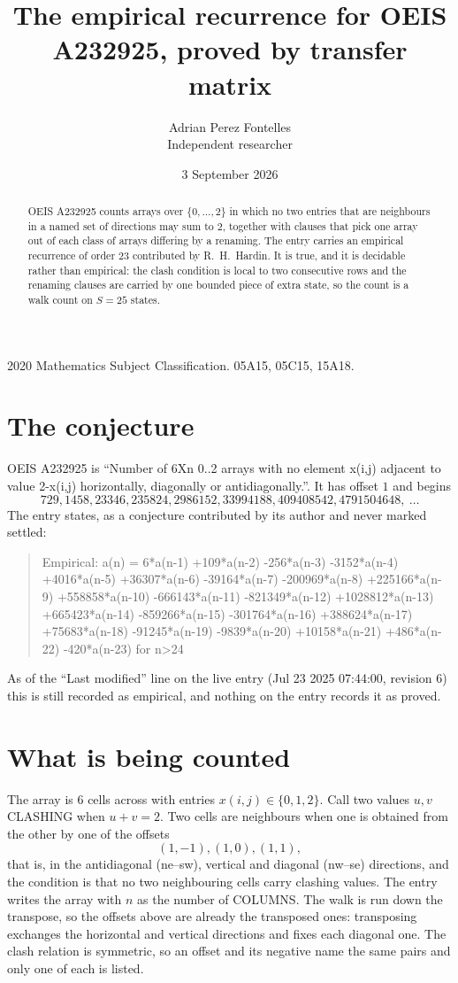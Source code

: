 \documentclass[11pt,a4paper]{article}
\title{The empirical recurrence for OEIS A232925, proved by transfer matrix}
\author{Adrian Perez Fontelles\\ \small Independent researcher}
\date{3 September 2026}
\theoremstyle{plain}
\theoremstyle{definition}
\begin{document}
\maketitle

\begin{abstract}
OEIS A232925 counts arrays over $\{0,\dots,2\}$ in which no two entries that are neighbours in
a named set of directions may sum to $2$, together with clauses that pick one array out of
each class of arrays differing by a renaming. The entry carries an empirical recurrence of
order $23$ contributed by R.~H.~Hardin. It is true, and it is decidable rather than
empirical: the clash condition is local to two consecutive rows and the renaming clauses are
carried by one bounded piece of extra state, so the count is a walk count on $S=25$ states.
\end{abstract}

\noindent\small 2020 Mathematics Subject Classification. 05A15, 05C15, 15A18.\normalsize

\section{The conjecture}

OEIS A232925 is ``Number of 6Xn 0..2 arrays with no element x(i,j) adjacent to value 2-x(i,j) horizontally, diagonally or antidiagonally.''. It has offset $1$ and begins
\[
729, 1458, 23346, 235824, 2986152, 33994188, 409408542, 4791504648,\ \dots
\]
The entry states, as a conjecture contributed by its author and never marked settled:
\begin{quote}
Empirical: a(n) = 6*a(n-1) +109*a(n-2) -256*a(n-3) -3152*a(n-4) +4016*a(n-5) +36307*a(n-6) -39164*a(n-7) -200969*a(n-8) +225166*a(n-9) +558858*a(n-10) -666143*a(n-11) -821349*a(n-12) +1028812*a(n-13) +665423*a(n-14) -859266*a(n-15) -301764*a(n-16) +388624*a(n-17) +75683*a(n-18) -91245*a(n-19) -9839*a(n-20) +10158*a(n-21) +486*a(n-22) -420*a(n-23) for n>24
\end{quote}
As of the ``Last modified'' line on the live entry (Jul 23 2025 07:44:00, revision 6) this is still
recorded as empirical, and nothing on the entry records it as proved.

\section{What is being counted}

The array is $6$ cells across with entries $x(i,j)\in\{0,1,2\}$. Call two values $u,v$ CLASHING
when $u+v=2$. Two cells are neighbours when one is obtained from the other by one of
the offsets
\[
(1,-1), (1,0), (1,1),
\]
that is, in the antidiagonal (ne--sw), vertical and diagonal (nw--se) directions, and the condition is that no two neighbouring cells carry
clashing values. The entry writes the array with $n$ as the number of COLUMNS. The walk is run down the transpose, so the offsets above are already the transposed ones: transposing exchanges the horizontal and vertical directions and fixes each diagonal one. The clash relation is symmetric, so an offset and its negative name the
same pairs and only one of each is listed.
\end{document}
